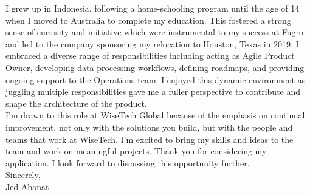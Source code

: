 I grew up in Indonesia, following a home-schooling program until the age of 14 when I moved to Australia to complete my education. This fostered a strong sense of curiosity and initiative which were instrumental to my success at Fugro and led to the company sponsoring my relocation to Houston, Texas in 2019. I embraced a diverse range of responsibilities including acting as Agile Product Owner, developing data processing workflows, defining roadmaps, and providing ongoing support to the Operations team. I enjoyed this dynamic environment as juggling multiple responsibilities gave me a fuller perspective to contribute and shape the architecture of the product. \\

I’m drawn to this role at WiseTech Global because of the emphasis on continual improvement, not only with the solutions you build, but with the people and teams that work at WiseTech. I'm excited to bring my skills and ideas to the team and work on meaningful projects. Thank you for considering my application. I look forward to discussing this opportunity further. \\

Sincerely,\\
Jed Abanat